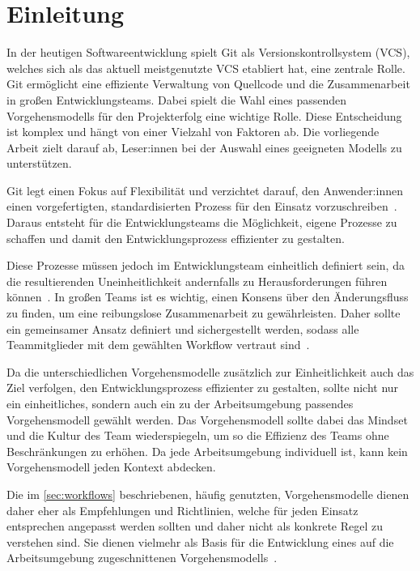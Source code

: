 
\setcounter{page}{1}

\section{Einleitung}
\label{sec:einleitung}

In der heutigen Softwareentwicklung spielt Git als Versionskontrollsystem (VCS), welches sich als das aktuell meistgenutzte VCS etabliert hat, eine zentrale Rolle. Git ermöglicht eine effiziente Verwaltung von Quellcode und die Zusammenarbeit in großen Entwicklungsteams. Dabei spielt die Wahl eines passenden Vorgehensmodells für den Projekterfolg eine wichtige Rolle. Diese Entscheidung ist komplex und hängt von einer Vielzahl von Faktoren ab. Die vorliegende Arbeit zielt darauf ab, Leser:innen bei der Auswahl eines geeigneten Modells zu unterstützen.

Git legt einen Fokus auf Flexibilität und verzichtet darauf, den Anwender:innen einen vorgefertigten, standardisierten Prozess für den Einsatz vorzuschreiben~\cite{atlassianComparingGitWorkflows2023}. Daraus entsteht für die Entwicklungsteams die Möglichkeit, eigene Prozesse zu schaffen und damit den Entwicklungsprozess effizienter zu gestalten. 

Diese Prozesse müssen jedoch im Entwicklungsteam einheitlich definiert sein, da die resultierenden Uneinheitlichkeit andernfalls zu Herausforderungen führen können~\cite{gitlabWhatGitWorkflow2023}. In großen Teams ist es wichtig, einen Konsens über den Änderungsfluss zu finden, um eine reibungslose Zusammenarbeit zu gewährleisten. Daher sollte ein gemeinsamer Ansatz definiert und sichergestellt werden, sodass alle Teammitglieder mit dem gewählten Workflow vertraut sind~\cite{atlassianComparingGitWorkflows2023}.

Da die unterschiedlichen Vorgehensmodelle zusätzlich zur Einheitlichkeit auch das Ziel verfolgen, den Entwicklungsprozess effizienter zu gestalten, sollte nicht nur ein einheitliches, sondern auch ein zu der Arbeitsumgebung passendes Vorgehensmodell gewählt werden. 
Das Vorgehensmodell sollte dabei das Mindset und die Kultur des Team wiederspiegeln, um so die Effizienz des Teams ohne Beschränkungen zu erhöhen. Da jede Arbeitsumgebung individuell ist, kann kein Vorgehensmodell jeden Kontext abdecken.

Die im \autoref{sec:workflows} beschriebenen, häufig genutzten, Vorgehensmodelle dienen daher eher als Empfehlungen und Richtlinien, welche für jeden Einsatz entsprechen angepasst werden sollten und daher nicht als konkrete Regel zu verstehen sind. Sie dienen vielmehr als Basis für die Entwicklung eines auf die Arbeitsumgebung zugeschnittenen Vorgehensmodells~\cite{atlassianComparingGitWorkflows2023}.

